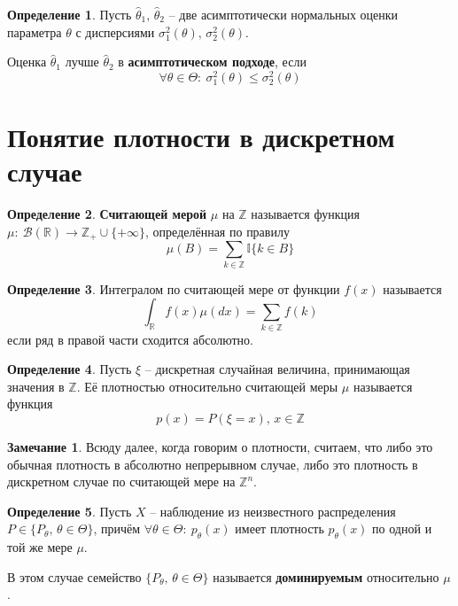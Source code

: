 \documentclass[a4paper,12pt]{article}
\renewcommand{\leq}{\ensuremath{\leqslant}}
\theoremstyle{plain}
\theoremstyle{definition}
\newtheorem{definition}{Определение}[section]
\newtheorem*{note}{Замечание}
\theoremstyle{remark}
\begin{document}
\begin{definition}
  Пусть $\hat{\theta}_1,\, \hat{\theta}_2$ -- две асимптотически нормальных оценки параметра $\theta$ с дисперсиями $\sigma_1^2(\theta),\, \sigma_2^2(\theta)$. 

  Оценка $\hat{\theta}_1$ лучше $\hat{\theta}_2$ в \textbf{асимптотическом подходе}, если
  \[
    \forall \theta \in \Theta :\: \sigma_1^2(\theta) \leq \sigma_2^2(\theta)
  \]
\end{definition}

\section{Понятие плотности в дискретном случае}
\begin{definition}
  \textbf{Считающей мерой} $\mu$ на $\mathbb{Z}$ называется функция $\mu :\: \mathcal{B}(\mathbb{R}) \to \mathbb{Z}_+ \cup \{+\infty\}$, определённая по правилу
  \[
    \mu(B) = \sum_{k \in \mathbb{Z}} \mathbb{I}\{k \in B\}
  \]
\end{definition}

\begin{definition}
  Интегралом по считающей мере от функции $f(x)$ называется 
  \[
    \int_\mathbb{R}f(x)\mu(dx) = \sum_{k \in \mathbb{Z}}f(k)
  \]
  если ряд в правой части сходится абсолютно.
\end{definition}

\begin{definition}
  Пусть $\xi$ -- дискретная случайная величина, принимающая значения в $\mathbb{Z}$. Её плотностью относительно считающей меры $\mu$ называется функция
  \[
    p(x) = P(\xi = x),\, x \in \mathbb{Z}
  \]
\end{definition}

\begin{note}
  Всюду далее, когда говорим о плотности, считаем, что либо это обычная плотность в абсолютно непрерывном случае, либо это плотность в дискретном случае по считающей мере на $\mathbb{Z}^n$.
\end{note}

\begin{definition}
  Пусть $X$ -- наблюдение из неизвестного распределения $P \in \{P_\theta,\, \theta \in \Theta\}$, причём $\forall \theta \in \Theta :\: p_\theta(x)$ имеет плотность $p_\theta(x)$ по одной и той же мере $\mu$.

  В этом случае семейство $\{P_\theta,\, \theta \in \Theta\}$ называется \textbf{доминируемым} относительно $\mu$.
\end{definition}
\end{document}
